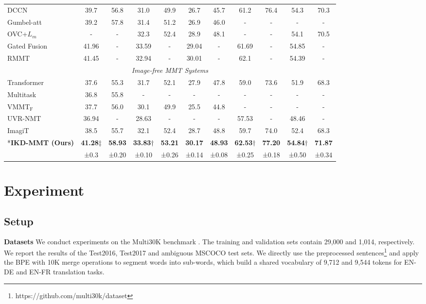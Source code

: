 \documentclass[11pt]{article}
\begin{document}
\begin{table*}[!t]
{\begin{tabular}{l|cccccc|cccc}
DCCN\cite{lin2020dynamic} & 39.7 & 56.8 & 31.0 & 49.9 & 26.7 & 45.7 & 61.2 & 76.4 & 54.3 & 70.3 \\
Gumbel-att\cite{liu2021gumbel} & 39.2 & 57.8 & 31.4 & 51.2 & 26.9 & 46.0 & - & - & - & - \\
OVC+${L}_{m}$\cite{wang2021efficient} & - & - & 32.3 & 52.4 & 28.9 & 48.1 & - & - & 54.1 & 70.5\\
Gated Fusion\cite{wu2021good} & 41.96 & - & 33.59 & - & 29.04 & - & 61.69 & - & 54.85 & - \\
RMMT\cite{wu2021good} & 41.45 & - & 32.94 & - & 30.01 & - & 62.1 & - & 54.39 & - \\
\hline
\multicolumn{11}{c}{\textit{Image-free MMT Systems}}\\
\hline
Transformer\cite{vaswani2017attention} & 37.6 & 55.3 & 31.7 & 52.1 & 27.9 & 47.8 & 59.0 & 73.6 & 51.9 & 68.3 \\
Multitask\cite{elliott-kadar-2017-imagination} & 36.8 & 55.8 & - & - & - & - & - & - & - & - \\
VMMT$_\text{F}$\cite{calixto-etal-2019-latent} & 37.7 & 56.0 & 30.1 & 49.9 & 25.5 & 44.8 & - & - & - & - \\
UVR-NMT\cite{Zhang2020Neural} & 36.94 & - & 28.63 & - & - & - & 57.53 & - & 48.46 & - \\
ImagiT \cite{long-etal-2021-generative} & 38.5 & 55.7 & 32.1 & 52.4 & 28.7 & 48.8 & 59.7 & 74.0 & 52.4 & 68.3 \\
\hdashline
\multirow{2}*{\textbf{IKD-MMT (Ours)}} & \textbf{41.28}$\ddagger$ & \textbf{58.93} & \textbf{33.83}$\dagger$ & \textbf{53.21} & \textbf{30.17} & \textbf{48.93} & \textbf{62.53}$\dagger$ & \textbf{77.20} & \textbf{54.84}$\dagger$ & \textbf{71.87} \\
& ±0.3 & ±0.20 & ±0.10 & ±0.26 & ±0.14 & ±0.08 & ±0.25 & ±0.18 & ±0.50 & ±0.34 \\
\hline
\hline
\end{tabular}}
\end{table*}


\section{Experiment}
\subsection{Setup}
\quad \textbf{Datasets}
We conduct experiments on the Multi30K benchmark \cite{elliott-etal-2016-multi30k}.
The training and validation sets contain 29,000 and 1,014, respectively.
We report the results of the Test2016, Test2017 and ambiguous MSCOCO test sets.
We directly use the preprocessed sentences\footnote{https://github.com/multi30k/dataset} and apply the BPE \cite{sennrich2016neural} with 10K merge operations to segment words into sub-words, which build a shared vocabulary of 9,712 and 9,544 tokens for EN-DE and EN-FR translation tasks.
\end{document}
